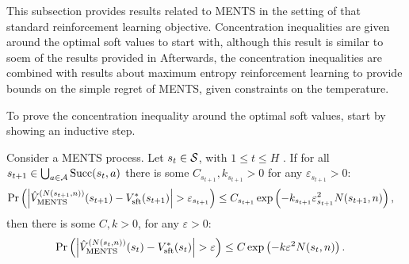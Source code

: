         This subsection provides results related to MENTS in the setting of that standard reinforcement learning objective. Concentration inequalities are given around the optimal soft values to start with, although this result is similar to soem of the results provided in \cite{ments}  Afterwards, the concentration inequalities are combined with results about maximum entropy reinforcement learning  to provide bounds on the simple regret of MENTS, given constraints on the temperature.
        








        To prove the concentration inequality around the optimal soft values, start by showing an inductive step.

        
        \begin{lemma} \label{lem:ments_val_induction_step}
            Consider a MENTS process. Let $s_t\in\mathcal{S}$, with $1\leq t \leq H$ . If for all $s_{t+1}\in\bigcup_{a\in\mathcal{A}}{\textnormal{Succ}(s_t,a)}$ there is some $C_{s_{t+1}},k_{s_{t+1}}>0$ for any $\varepsilon_{s_{t+1}}>0$:
            \begin{align}
                \Pr\left(\left| {\hat{V}^{(N(s_{t+1},n))}_{{\textnormal{MENTS}}}}(s_{t+1}) - V_{{\textnormal{sft}}}^*(s_{t+1}) \right| > \varepsilon_{s_{t+1}} \right) 
                    &\leq C_{s_{t+1}}\exp\left( -k_{s_{t+1}}\varepsilon_{s_{t+1}}^2 N(s_{t+1},n) \right), 
            \end{align}
            then there is some $C,k>0$, for any $\varepsilon>0$:
            \begin{align}
                \Pr\left(\left| {\hat{V}^{(N(s_{t},n))}_{{\textnormal{MENTS}}}}(s_t) - V_{{\textnormal{sft}}}^*(s_{t}) \right| > \varepsilon \right) 
                    &\leq C\exp\left( -k\varepsilon^2 N(s_{t},n) \right).
            \end{align}
        \end{lemma}
        
